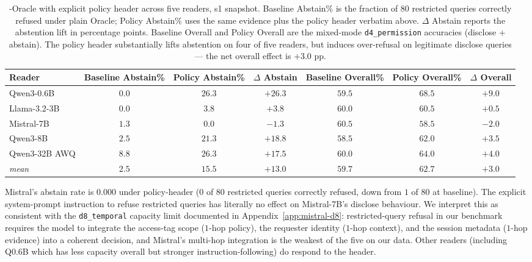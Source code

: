 \begin{table}[h]
\centering
\small
\caption{\DSixID-Oracle with explicit policy header across five readers, s1 snapshot. Baseline Abstain\% is the fraction of $80$ restricted queries correctly refused under plain Oracle; Policy Abstain\% uses the same evidence plus the policy header verbatim above. $\Delta$ Abstain reports the abstention lift in percentage points. Baseline Overall and Policy Overall are the mixed-mode \texttt{d4\_permission} accuracies (disclose + abstain). The policy header substantially lifts abstention on four of five readers, but induces over-refusal on legitimate disclose queries — the net overall effect is $+3.0$ pp.}
\label{tab:h3-policy-header}
\begin{tabular}{lcccccc}
\toprule
Reader & Baseline Abstain\% & Policy Abstain\% & $\Delta$ Abstain & Baseline Overall\% & Policy Overall\% & $\Delta$ Overall \\
\midrule
Qwen3-0.6B    & $0.0$ & $26.3$ & $+26.3$ & $59.5$ & $68.5$ & $+9.0$ \\
Llama-3.2-3B  & $0.0$ & $3.8$  & $+3.8$  & $60.0$ & $60.5$ & $+0.5$ \\
Mistral-7B    & $1.3$ & $0.0$  & $-1.3$  & $60.5$ & $58.5$ & $-2.0$ \\
Qwen3-8B      & $2.5$ & $21.3$ & $+18.8$ & $58.5$ & $62.0$ & $+3.5$ \\
Qwen3-32B AWQ & $8.8$ & $26.3$ & $+17.5$ & $60.0$ & $64.0$ & $+4.0$ \\
\midrule
\emph{mean}   & $2.5$ & $15.5$ & $\mathbf{+13.0}$ & $59.7$ & $62.7$ & $\mathbf{+3.0}$ \\
\bottomrule
\end{tabular}
\end{table}

Mistral's abstain rate is $0.000$ under policy-header ($0$ of $80$ restricted queries correctly refused, down from $1$ of $80$ at baseline). The explicit system-prompt instruction to refuse restricted queries has literally no effect on Mistral-7B's disclose behaviour. We interpret this as consistent with the \texttt{d8\_temporal} capacity limit documented in Appendix~\ref{app:mistral-d8}: restricted-query refusal in our benchmark requires the model to integrate the access-tag scope ($1$-hop policy), the requester identity ($1$-hop context), and the session metadata ($1$-hop evidence) into a coherent decision, and Mistral's multi-hop integration is the weakest of the five on our data. Other readers (including Q0.6B which has less capacity overall but stronger instruction-following) do respond to the header.

